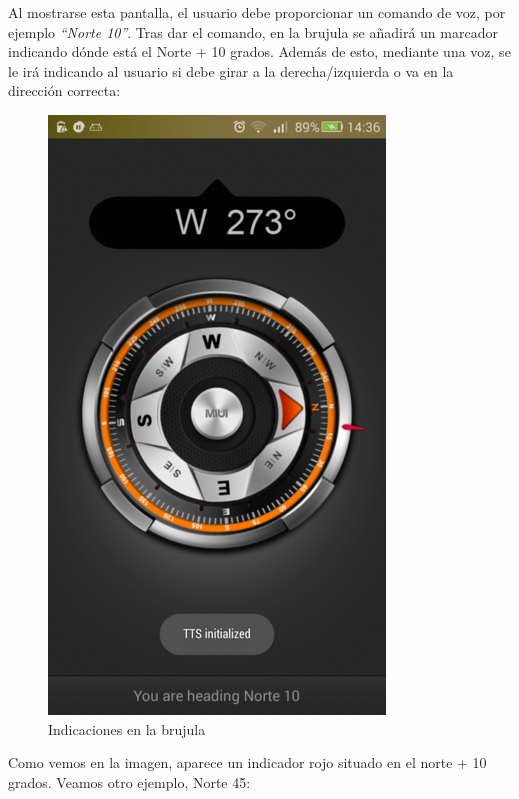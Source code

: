 Al mostrarse esta pantalla, el usuario debe proporcionar un comando de
voz, por ejemplo \emph{``Norte 10''}. Tras dar el comando, en la brujula
se añadirá un marcador indicando dónde está el Norte + 10 grados. Además
de esto, mediante una voz, se le irá indicando al usuario si debe girar
a la derecha/izquierda o va en la dirección correcta:

\begin{figure}[htbp]
\centering
\includegraphics{./img/norte10.png}
\caption{Indicaciones en la brujula}
\end{figure}

Como vemos en la imagen, aparece un indicador rojo situado en el norte +
10 grados. Veamos otro ejemplo, Norte 45:

